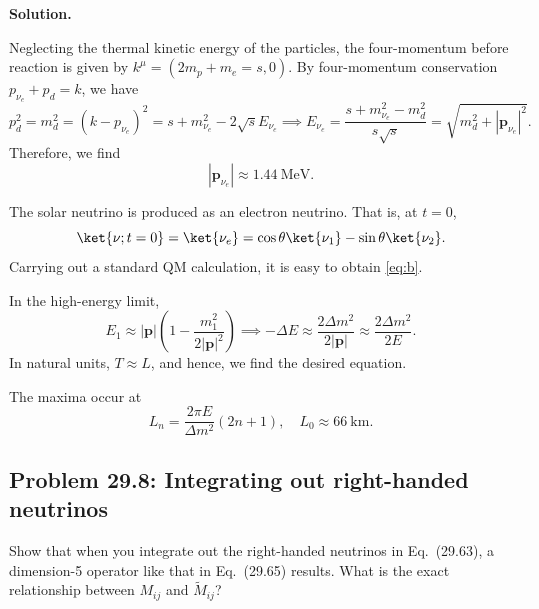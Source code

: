 \documentclass[a4paper,11pt]{article}
\newenvironment{solution}{\par\medskip\noindent\textbf{Solution.}\par\smallskip}{\par\medskip}
\begin{document}
\begin{solution}
    Neglecting the thermal kinetic energy of the particles, the four-momentum before reaction is given by $k^\mu = (2m_p + m_e = s, 0 )$. By four-momentum conservation $p_{\nu_e} + p_d = k$, we have
    \begin{equation}
        p_d^2 = m_d^2 = (k-p_{\nu_e})^2 = s+ m_{\nu_e}^2 -2\sqrt{s}E_{\nu_e} \implies E_{\nu_e} = \frac{s+m_{\nu_e}^2 -m_d^2}{s\sqrt{s}} = \sqrt{m_d^2 +|\mathbf{p}_{\nu_e}|^2}.
    \end{equation}
    Therefore, we find
    \begin{equation}
        |\mathbf{p}_{\nu_e}| \approx 1.44 ~\mathrm{MeV}.
    \end{equation}

    The solar neutrino is produced as an electron neutrino. That is, at $t=0$,
    \begin{equation}
        \ket{\nu;t=0} = \ket{\nu_e} = \cos\theta\ket{\nu_1} - \sin\theta \ket{\nu_2}.
    \end{equation}
    Carrying out a standard QM calculation, it is easy to obtain \eqref{eq:b}.

    In the high-energy limit,
    \begin{equation}
        E_1  \approx |\mathbf{p}|\left(1-\frac{m_1^2}{2|\mathbf{p}|^2}\right) \implies -\Delta E \approx \frac{2\Delta m^2}{2|\mathbf{p}|} \approx \frac{2\Delta m^2}{2E}.
    \end{equation}
    In natural units, $T \approx L$, and hence, we find the desired equation.

    The maxima occur at
    \begin{equation}
        L_n = \frac{2\pi E}{\Delta m^2}(2n+1), \quad L_0 \approx 66 ~\mathrm{km}.
    \end{equation}
\end{solution}

\subsection[Problem 29.8: Integrating out right-handed neutrinos]{Problem 29.8: Integrating out right-handed neutrinos}

Show that when you integrate out the right-handed neutrinos in Eq.~(29.63), a
dimension-5 operator like that in Eq.~(29.65) results. What is the exact
relationship between $M_{ij}$ and $\widetilde M_{ij}$?
\end{document}
